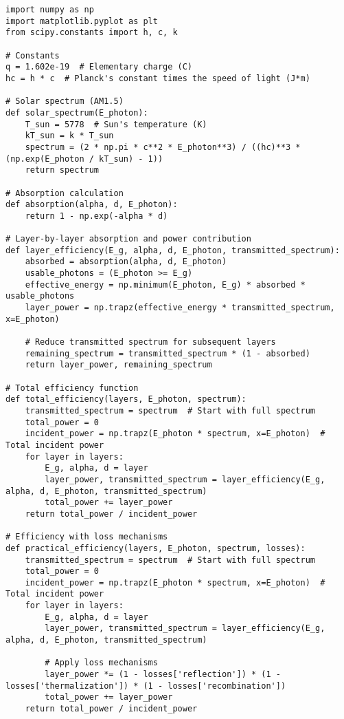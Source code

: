 \documentclass[11pt]{article}
\begin{document}
\begin{lstlisting}[style=custompython, caption=Python Code for Solar Cell Efficiency Simulator]
import numpy as np
import matplotlib.pyplot as plt
from scipy.constants import h, c, k

# Constants
q = 1.602e-19  # Elementary charge (C)
hc = h * c  # Planck's constant times the speed of light (J*m)

# Solar spectrum (AM1.5)
def solar_spectrum(E_photon):
    T_sun = 5778  # Sun's temperature (K)
    kT_sun = k * T_sun
    spectrum = (2 * np.pi * c**2 * E_photon**3) / ((hc)**3 * (np.exp(E_photon / kT_sun) - 1))
    return spectrum

# Absorption calculation
def absorption(alpha, d, E_photon):
    return 1 - np.exp(-alpha * d)

# Layer-by-layer absorption and power contribution
def layer_efficiency(E_g, alpha, d, E_photon, transmitted_spectrum):
    absorbed = absorption(alpha, d, E_photon)
    usable_photons = (E_photon >= E_g)
    effective_energy = np.minimum(E_photon, E_g) * absorbed * usable_photons
    layer_power = np.trapz(effective_energy * transmitted_spectrum, x=E_photon)
    
    # Reduce transmitted spectrum for subsequent layers
    remaining_spectrum = transmitted_spectrum * (1 - absorbed)
    return layer_power, remaining_spectrum

# Total efficiency function
def total_efficiency(layers, E_photon, spectrum):
    transmitted_spectrum = spectrum  # Start with full spectrum
    total_power = 0
    incident_power = np.trapz(E_photon * spectrum, x=E_photon)  # Total incident power
    for layer in layers:
        E_g, alpha, d = layer
        layer_power, transmitted_spectrum = layer_efficiency(E_g, alpha, d, E_photon, transmitted_spectrum)
        total_power += layer_power
    return total_power / incident_power

# Efficiency with loss mechanisms
def practical_efficiency(layers, E_photon, spectrum, losses):
    transmitted_spectrum = spectrum  # Start with full spectrum
    total_power = 0
    incident_power = np.trapz(E_photon * spectrum, x=E_photon)  # Total incident power
    for layer in layers:
        E_g, alpha, d = layer
        layer_power, transmitted_spectrum = layer_efficiency(E_g, alpha, d, E_photon, transmitted_spectrum)
        
        # Apply loss mechanisms
        layer_power *= (1 - losses['reflection']) * (1 - losses['thermalization']) * (1 - losses['recombination'])
        total_power += layer_power
    return total_power / incident_power


\end{lstlisting}
\end{document}
